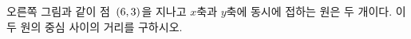 \noindent\begin{minipage}[t]{0.58\linewidth}\vspace{0pt}\raggedright 오른쪽 그림과 같이 점~$(6{,}\mkern3mu\mathopen{}3)$을 지나고 $x$축과 $y$축에 동시에 접하는 원은 두 개이다. 이 두 원의 중심 사이의 거리를 구하시오.\end{minipage}\hfill\begin{minipage}[t]{0.4\linewidth}\vspace{0pt}\centering \resizebox{\ifdim\width>\linewidth\linewidth\else\width\fi}{!}{}\end{minipage}\par

